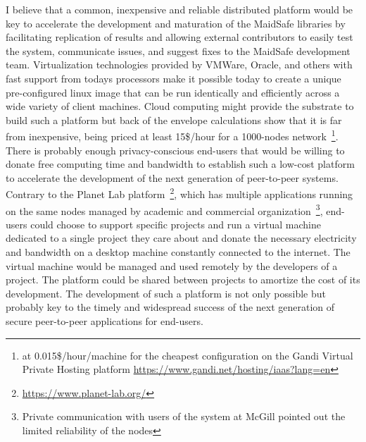 I believe that a common, inexpensive and reliable distributed platform would be key to accelerate the development and maturation of the MaidSafe libraries by facilitating replication of results and allowing external contributors to easily test the system, communicate issues, and suggest fixes to the MaidSafe development team. Virtualization technologies provided by VMWare, Oracle, and others with fast support from todays processors make it possible today to create a unique pre-configured linux image that can be run identically and efficiently across a wide variety of client machines. Cloud computing might provide the substrate to build such a platform but back of the envelope calculations show that it is far from inexpensive, being priced at least 15\$/hour for a 1000-nodes network~\footnote{at 0.015\$/hour/machine for the cheapest configuration on the Gandi Virtual Private Hosting platform \url{https://www.gandi.net/hosting/iaas?lang=en}}. There is probably enough privacy-conscious end-users that would be willing to donate free computing time and bandwidth to establish such a low-cost platform to accelerate the development of the next generation of peer-to-peer systems. Contrary to the Planet Lab platform~\footnote{\url{https://www.planet-lab.org/}}, which has multiple applications running on the same nodes managed by academic and commercial organization~\footnote{Private communication with users of the system at McGill pointed out the limited reliability of the nodes}, end-users could choose to support specific projects and run a virtual machine dedicated to a single project they care about and donate the necessary electricity and bandwidth on a desktop machine constantly connected to the internet. The virtual machine would be managed and used remotely by the developers of a project. The platform could be shared between projects to amortize the cost of its development. The development of such a platform is not only possible but probably key to the timely and widespread success of the next generation of secure peer-to-peer applications for end-users.

